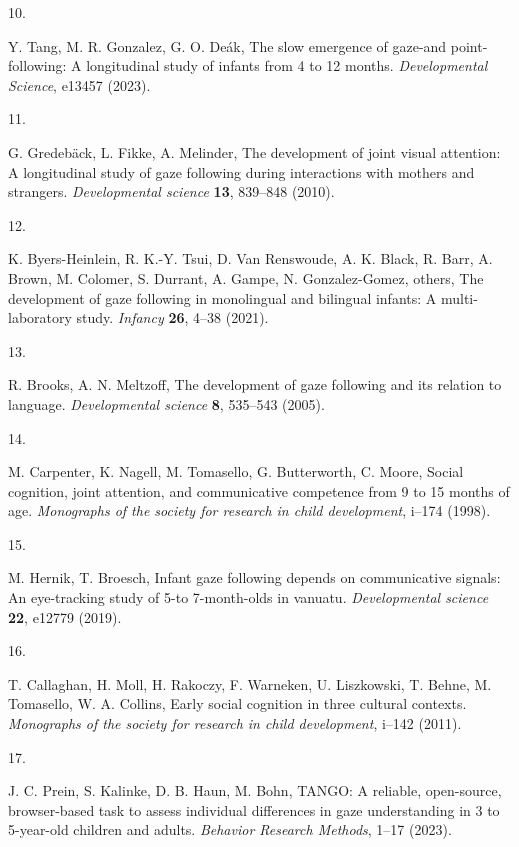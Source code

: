 \documentclass[
  man,floatsintext]{apa6}
\newlength{\cslhangindent}
\newlength{\csllabelwidth}
\newlength{\cslentryspacingunit} %
\newenvironment{CSLReferences}[2] %
 {%
  \setlength{\parindent}{0pt}
  \ifodd #1
  \let\oldpar\par
  \def\par{\hangindent=\cslhangindent\oldpar}
  \fi
  \setlength{\parskip}{#2\cslentryspacingunit}
 }%
 {}
\newcommand{\CSLLeftMargin}[1]{\parbox[t]{\csllabelwidth}{#1}}
\newcommand{\CSLRightInline}[1]{\parbox[t]{\linewidth - \csllabelwidth}{#1}\break}
\begin{document}
\begin{CSLReferences}{0}{0}
\leavevmode{}%
\CSLLeftMargin{10. }%
\CSLRightInline{Y. Tang, M. R. Gonzalez, G. O. Deák, The slow emergence of gaze-and point-following: A longitudinal study of infants from 4 to 12 months. \emph{Developmental Science}, e13457 (2023).}

\leavevmode{}%
\CSLLeftMargin{11. }%
\CSLRightInline{G. Gredebäck, L. Fikke, A. Melinder, The development of joint visual attention: A longitudinal study of gaze following during interactions with mothers and strangers. \emph{Developmental science} \textbf{13}, 839--848 (2010).}

\leavevmode{}%
\CSLLeftMargin{12. }%
\CSLRightInline{K. Byers-Heinlein, R. K.-Y. Tsui, D. Van Renswoude, A. K. Black, R. Barr, A. Brown, M. Colomer, S. Durrant, A. Gampe, N. Gonzalez-Gomez, others, The development of gaze following in monolingual and bilingual infants: A multi-laboratory study. \emph{Infancy} \textbf{26}, 4--38 (2021).}

\leavevmode{}%
\CSLLeftMargin{13. }%
\CSLRightInline{R. Brooks, A. N. Meltzoff, The development of gaze following and its relation to language. \emph{Developmental science} \textbf{8}, 535--543 (2005).}

\leavevmode{}%
\CSLLeftMargin{14. }%
\CSLRightInline{M. Carpenter, K. Nagell, M. Tomasello, G. Butterworth, C. Moore, Social cognition, joint attention, and communicative competence from 9 to 15 months of age. \emph{Monographs of the society for research in child development}, i--174 (1998).}

\leavevmode{}%
\CSLLeftMargin{15. }%
\CSLRightInline{M. Hernik, T. Broesch, Infant gaze following depends on communicative signals: An eye-tracking study of 5-to 7-month-olds in vanuatu. \emph{Developmental science} \textbf{22}, e12779 (2019).}

\leavevmode{}%
\CSLLeftMargin{16. }%
\CSLRightInline{T. Callaghan, H. Moll, H. Rakoczy, F. Warneken, U. Liszkowski, T. Behne, M. Tomasello, W. A. Collins, Early social cognition in three cultural contexts. \emph{Monographs of the society for research in child development}, i--142 (2011).}

\leavevmode{}%
\CSLLeftMargin{17. }%
\CSLRightInline{J. C. Prein, S. Kalinke, D. B. Haun, M. Bohn, TANGO: A reliable, open-source, browser-based task to assess individual differences in gaze understanding in 3 to 5-year-old children and adults. \emph{Behavior Research Methods}, 1--17 (2023).}


\end{CSLReferences}
\end{document}
